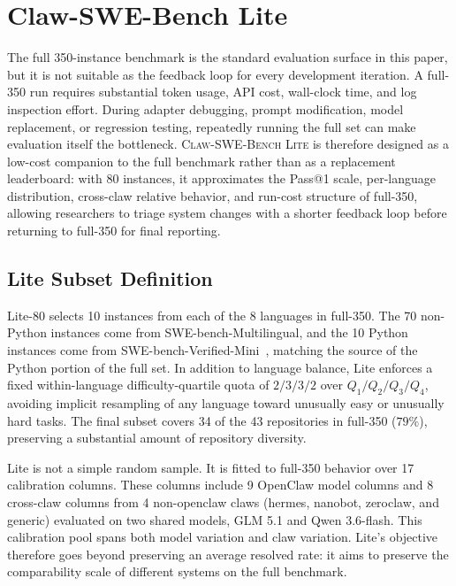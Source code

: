 \section{Claw-SWE-Bench Lite}
\label{sec:lite}

The full 350-instance benchmark is the standard evaluation surface in this paper, but it is not suitable as the feedback loop for every development iteration. A full-350 run requires substantial token usage, API cost, wall-clock time, and log inspection effort. During adapter debugging, prompt modification, model replacement, or regression testing, repeatedly running the full set can make evaluation itself the bottleneck. \textsc{Claw-SWE-Bench Lite} is therefore designed as a low-cost companion to the full benchmark rather than as a replacement leaderboard: with 80 instances, it approximates the Pass@1 scale, per-language distribution, cross-claw relative behavior, and run-cost structure of full-350, allowing researchers to triage system changes with a shorter feedback loop before returning to full-350 for final reporting.

\subsection{Lite Subset Definition}
\label{sec:lite-def}

Lite-80 selects 10 instances from each of the 8 languages in full-350. The 70 non-Python instances come from SWE-bench-Multilingual, and the 10 Python instances come from SWE-bench-Verified-Mini~\cite{swebench_verified_mini}, matching the source of the Python portion of the full set. In addition to language balance, Lite enforces a fixed within-language difficulty-quartile quota of $2/3/3/2$ over $Q_1/Q_2/Q_3/Q_4$, avoiding implicit resampling of any language toward unusually easy or unusually hard tasks. The final subset covers 34 of the 43 repositories in full-350 ($79\%$), preserving a substantial amount of repository diversity.

Lite is not a simple random sample. It is fitted to full-350 behavior over 17 calibration columns. These columns include 9 OpenClaw model columns and 8 cross-claw columns from 4 non-openclaw claws (hermes, nanobot, zeroclaw, and generic) evaluated on two shared models, GLM 5.1 and Qwen 3.6-flash. This calibration pool spans both model variation and claw variation. Lite's objective therefore goes beyond preserving an average resolved rate: it aims to preserve the comparability scale of different systems on the full benchmark.

